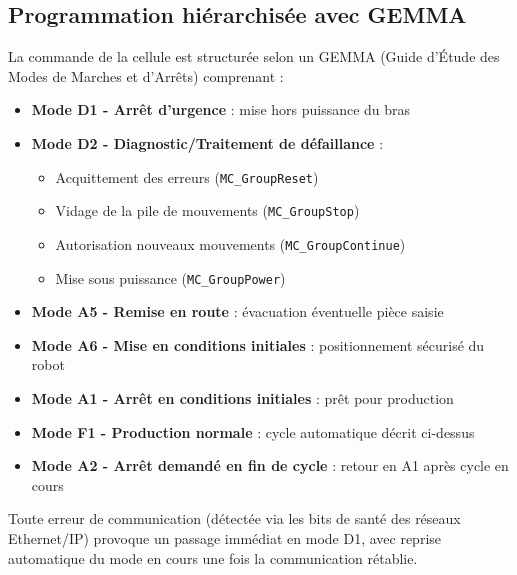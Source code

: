 \subsection{Programmation hiérarchisée avec GEMMA}

La commande de la cellule est structurée selon un GEMMA (Guide d'Étude des Modes de Marches et d'Arrêts) comprenant :

\begin{itemize}
    \item \textbf{Mode D1 - Arrêt d'urgence} : mise hors puissance du bras
    \item \textbf{Mode D2 - Diagnostic/Traitement de défaillance} :
    \begin{itemize}
        \item Acquittement des erreurs (\texttt{MC\_GroupReset})
        \item Vidage de la pile de mouvements (\texttt{MC\_GroupStop})
        \item Autorisation nouveaux mouvements (\texttt{MC\_GroupContinue})
        \item Mise sous puissance (\texttt{MC\_GroupPower})
    \end{itemize}
    \item \textbf{Mode A5 - Remise en route} : évacuation éventuelle pièce saisie
    \item \textbf{Mode A6 - Mise en conditions initiales} : positionnement sécurisé du robot
    \item \textbf{Mode A1 - Arrêt en conditions initiales} : prêt pour production
    \item \textbf{Mode F1 - Production normale} : cycle automatique décrit ci-dessus
    \item \textbf{Mode A2 - Arrêt demandé en fin de cycle} : retour en A1 après cycle en cours
\end{itemize}

Toute erreur de communication (détectée via les bits de santé des réseaux Ethernet/IP) provoque un passage immédiat en mode D1, avec reprise automatique du mode en cours une fois la communication rétablie.

